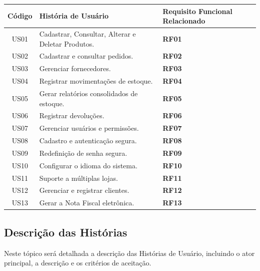 \documentclass[
	12pt,				%
	openany,			%
	twoside,			%
	a4paper,			%
	english,			%
	brazil				%
	]{abntex2}
\begin{document}
\begin{quadro}[htb]
\centering
\caption{Histórias de Usuário (US01 a US13)}
\label{hist_usuarios}
\begin{tabular}{|c|p{10cm}|p{4cm}|}
\hline
\textbf{Código} & \textbf{História de Usuário} & \textbf{Requisito Funcional Relacionado} \\
\hline
US01 & Cadastrar, Consultar, Alterar e Deletar Produtos. & \textbf{RF01} \\ \hline
US02 & Cadastrar e consultar pedidos. & \textbf{RF02} \\ \hline
US03 & Gerenciar fornecedores. & \textbf{RF03} \\ \hline
US04 & Registrar movimentações de estoque. & \textbf{RF04} \\ \hline
US05 & Gerar relatórios consolidados de estoque. & \textbf{RF05} \\ \hline
US06 & Registrar devoluções. & \textbf{RF06} \\ \hline
US07 & Gerenciar usuários e permissões. & \textbf{RF07} \\ \hline
US08 & Cadastro e autenticação segura. & \textbf{RF08} \\ \hline
US09 & Redefinição de senha segura. & \textbf{RF09} \\ \hline
US10 & Configurar o idioma do sistema. & \textbf{RF10} \\ \hline
US11 & Suporte a múltiplas lojas. & \textbf{RF11} \\ \hline
US12 & Gerenciar e registrar clientes. & \textbf{RF12} \\ \hline
US13 & Gerar a Nota Fiscal eletrônica. & \textbf{RF13} \\ \hline
\hline
\end{tabular}
\end{quadro}

\FloatBarrier

\subsection{Descrição das Histórias}

Neste tópico será detalhada a descrição das Histórias de Usuário, incluindo o ator principal, a descrição e os critérios de aceitação.
\end{document}
